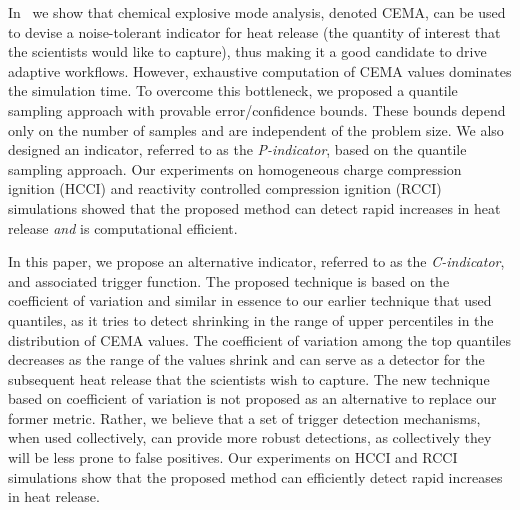 \documentclass{sig-alternate}
\newcommand{\cmetric}{C}
\newcommand{\pmetric}{P}
\begin{document}
In~\cite{cema-insitu} we show 
that chemical explosive mode analysis,  denoted CEMA, can be used to devise a 
noise-tolerant indicator for  heat release (the quantity of interest that the
scientists would like to capture), thus making it a good candidate to drive adaptive workflows. However, 
exhaustive computation of CEMA values dominates the  simulation time.  To overcome this 
bottleneck, we proposed a quantile sampling approach with provable
error/confidence bounds. These bounds depend only on  
 the number of samples and  are independent of the problem size.  We also designed an indicator, referred to as 
 the \emph{\pmetric-indicator},  based on the quantile sampling approach.  Our experiments on homogeneous charge compression ignition
(HCCI)  and reactivity controlled compression ignition (RCCI) simulations showed
 that the proposed method can detect rapid increases in heat release \emph{and} is computational efficient.

In this paper, we propose an alternative indicator, referred to as the
\emph{\cmetric-indicator}, and associated trigger function. 
The proposed technique is based on the coefficient of variation and similar in 
essence to our earlier technique that used quantiles, as it  tries to detect 
shrinking in the range of upper percentiles in the distribution of CEMA values.  
The coefficient of variation among the top quantiles decreases as the  range of the
values shrink and  can serve as a detector for the subsequent heat release
that  the scientists wish to capture. 
The new technique based on  coefficient of variation is not  proposed as an
alternative to replace our former metric. Rather, we  believe that a set of trigger detection mechanisms, 
when used collectively,  can provide more robust detections, as  collectively
they will be  less prone to false positives. 
Our experiments on HCCI  and RCCI simulations 
show that the proposed method can  efficiently detect rapid increases in heat release. 
\end{document}
